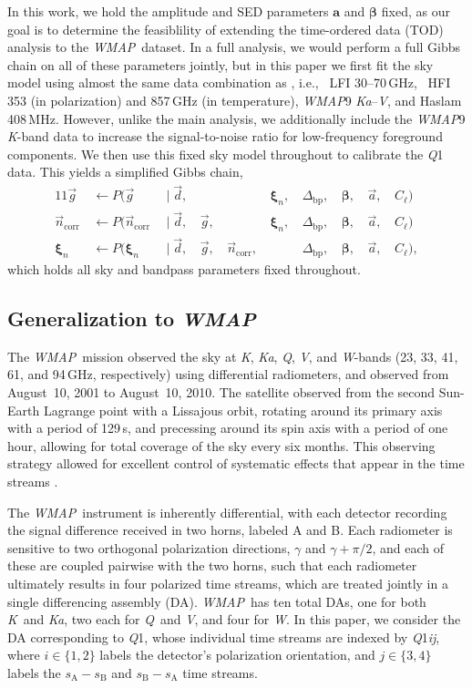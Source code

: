 \documentclass[twocolumn]{aa}
\def\WMAP{\emph{WMAP}}
\renewcommand{\d}[0]{\vec{d}}
\newcommand{\A}[0]{\mathrm{A}}
\newcommand{\B}[0]{\mathrm{B}}
\renewcommand{\a}[0]{\vec{a}}
\newcommand{\g}[0]{\vec{g}}
\newcommand{\K}[0]{\textit K}
\newcommand{\Ka}[0]{\textit{Ka}}
\newcommand{\Q}[0]{\textit Q}
\newcommand{\V}[0]{\textit V}
\newcommand{\W}[0]{\textit W}
\newcommand{\ncorr}{\vec n_\mathrm{corr}}
\newcommand{\Dbp}{\Delta_\mathrm{bp}}
\begin{document}
In this work, we hold the amplitude and SED parameters $\boldsymbol a$
and $\boldsymbol\beta$ fixed, as our goal is to determine the
feasiblility of extending the time-ordered data (TOD) analysis to the
\WMAP\ dataset. In a full analysis, we would perform a full Gibbs
chain on all of these parameters jointly, but in this paper we first
fit the sky model using almost the same data combination as
\citet{bp01}, i.e., \Planck\ LFI 30--70\,GHz, \Planck\ HFI 353 (in
polarization) and 857\,GHz (in temperature), \WMAP9 \Ka--\V, and Haslam
408\,MHz. However, unlike the main analysis, we additionally include
the \WMAP9 \textit K-band data to increase the signal-to-noise ratio
for low-frequency foreground components.  We then use this fixed sky
model throughout to calibrate the \Q1 data.
This yields a simplified Gibbs chain,
\begin{alignat}{11}
\g &\,\leftarrow          P(\g&\,               \mid \d, &\,    &          &\,\boldsymbol\xi_n,  &\,\Dbp, &\,\boldsymbol\beta, &\,\a, &\,C_{\ell})\\
\ncorr &\,\leftarrow    P(\ncorr&\,           \mid \d, &\,\g, &\,        &\,\boldsymbol\xi_n,  &\,\Dbp, &\,\boldsymbol\beta, &\,\a, &\,C_{\ell})\\ 
\boldsymbol\xi_n &\,\leftarrow        P(\boldsymbol\xi_n&\,            \mid \d, &\,\g, &\,\ncorr, &\,        &\,\Dbp, &\,\boldsymbol\beta, &\,\a, &\,C_{\ell}),
\end{alignat}
which holds all sky and bandpass parameters fixed throughout.

\subsection{Generalization to \WMAP}

The \WMAP\ mission \citep{bennett2012} observed the sky at \K, \Ka, \Q, \V, and
\W-bands (23, 33, 41, 61, and 94\,GHz, respectively) using differential
radiometers, and observed from August~10, 2001 to August~10, 2010. The
satellite observed from the second Sun-Earth Lagrange point with a Lissajous
orbit, rotating around its primary axis with a period of 129\,s, and precessing
around its spin axis with a period of one hour, allowing for total coverage of
the sky every six months. This observing strategy allowed for excellent control
of systematic effects that appear in the time streams \citep{bennett2003:MAP}.

The \WMAP\ instrument is inherently differential, with each detector recording
the signal difference received in two horns, labeled A and B. Each radiometer
is sensitive to two orthogonal polarization directions, $\gamma$ and
$\gamma+\pi/2$, and each of these are coupled pairwise with the two horns,
such that each radiometer ultimately results in
four polarized time streams, which are treated jointly in a  single
differencing assembly (DA). 
\WMAP\ has ten total DAs, one for both \K\ and \Ka, two each for \Q\ and \V, and four for \W.
In this paper, we consider the DA corresponding to
\Q1, whose individual time streams are indexed by \Q1\textit{ij}, where
$i\in\{1,2\}$ labels the detector's polarization orientation, and $j\in\{3,4\}$
labels the $s_\A-s_\B$ and $s_\B-s_\A$ time streams.
\end{document}
